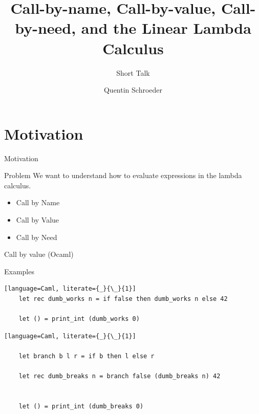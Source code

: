 \documentclass[10pt]{beamer}
\title{Call-by-name, Call-by-value, Call-by-need, and the Linear Lambda Calculus }
\subtitle{Short Talk}
\date{}
\author{Quentin Schroeder}
\institute{MPRI - Université Paris-Cité}
\begin{document}
\maketitle


\section[Idea]{Motivation}



\begin{frame}[fragile]{Motivation}
  \begin{alertblock}{Problem}
    We want to understand how to evaluate expressions in the lambda calculus.\\
  \end{alertblock}

  \begin{itemize} [<+- | alert@+>]
    \item Call by Name
    \item Call by Value
    \item Call by Need
  \end{itemize}
\end{frame}


\begin{frame}[fragile]{Call by value (Ocaml)}
  \begin{alertblock}{Examples}
  \begin{lstlisting}[language=Caml, literate={_}{\_}{1}]
    let rec dumb_works n = if false then dumb_works n else 42

    let () = print_int (dumb_works 0)

  \end{lstlisting}
  \pause
  \begin{lstlisting}[language=Caml, literate={_}{\_}{1}]

    let branch b l r = if b then l else r

    let rec dumb_breaks n = branch false (dumb_breaks n) 42


    let () = print_int (dumb_breaks 0)

  \end{lstlisting}
  \end{alertblock}
\end{frame}
\end{document}
